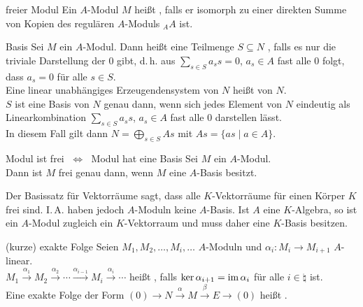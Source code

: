 \begin{Def}{freier Modul}
    Ein $A$-Modul $M$ heißt ,
    falls er isomorph zu einer direkten Summe von Kopien des
    regulären $A$-Moduls ${}_A A$ ist.
\end{Def}

\begin{Def}{Basis}
    Sei $M$ ein $A$-Modul.
    Dann heißt eine Teilmenge $S \subseteq N$ ,
    falls es nur die triviale Darstellung der $0$ gibt, d.\,h.
    aus $\sum_{s \in S} a_s s = 0$, $a_s \in A$ fast alle $0$ folgt,
    dass $a_s = 0$ für alle $s \in S$. \\
    Eine linear unabhängiges Erzeugendensystem von $N$ heißt
     von $N$. \\
    $S$ ist eine Basis von $N$ genau dann, wenn
    sich jedes Element von $N$ eindeutig als Linearkombination
    $\sum_{s \in S} a_s s$, $a_s \in A$ fast alle $0$ darstellen
    lässt. \\
    In diesem Fall gilt dann $N = \bigoplus_{s \in S} A s$
    mit $A s = \{as \;|\; a \in A\}$.
\end{Def}

\pagebreak

\begin{Satz}{Modul ist frei $\;\Leftrightarrow\;$ Modul hat eine Basis}
    Sei $M$ ein $A$-Modul. \\
    Dann ist $M$ frei genau dann, wenn
    $M$ eine $A$-Basis besitzt.
\end{Satz}

\enlargethispage{10mm}

\begin{Bem}
    Der Basissatz für Vektorräume sagt, dass alle $K$-Vektorräume
    für einen Körper $K$ frei sind.
    I.\,A. haben jedoch $A$-Moduln keine $A$-Basis.
    Ist $A$ eine $K$-Algebra, so ist ein $A$-Modul zugleich ein
    $K$-Vektorraum und muss daher eine $K$-Basis besitzen.
\end{Bem}

\begin{Def}{(kurze) exakte Folge}
    Seien $M_1, M_2, \dotsc, M_i, \dotsc$ $A$-Moduln und
    $\alpha_i: M_i \rightarrow M_{i+1}$ $A$-linear. \\
    $M_1 \xrightarrow{\alpha_1} M_2 \xrightarrow{\alpha_2} \dotsb
    \xrightarrow{\alpha_{i-1}} M_i \xrightarrow{\alpha_i} \dotsb$
    heißt , falls $\ker \alpha_{i+1} = \operatorname{im} \alpha_i$
    für alle $i \in \natural$ ist. \\
    Eine exakte Folge der Form $(0) \rightarrow N \xrightarrow{\alpha} M
    \xrightarrow{\beta} E \rightarrow (0)$
    heißt .
\end{Def}

